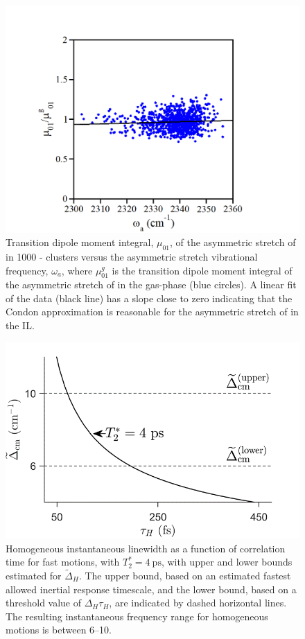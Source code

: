 \documentclass[]{article}
\begin{document}
\begin{figure}[h]
  \centering
  \includegraphics{figure3.png}
  \caption{Transition dipole moment integral, \(\mu_{01}\), of the asymmetric stretch of  in 1000 -\ce{[C4C1im][PF6]} clusters versus the asymmetric stretch vibrational frequency, \(\omega_{a}\), where \(\mu_{01}^{g}\) is the transition dipole moment integral of the asymmetric stretch of  in the gas-phase (blue circles). A linear fit of the data (black line) has a slope close to zero indicating that the Condon approximation is reasonable for the asymmetric stretch of  in the \ce{[C4C1im][PF6]} IL.}
  \label{paper_03:fig3}
\end{figure}

\begin{figure}[h]
  \centering
  \includegraphics{figure4.png}
  \caption{Homogeneous instantaneous linewidth as a function of correlation time for fast motions, with \(T_{2}^{*} = \SI{4}{\pico\second}\), with upper and lower bounds estimated for \({\widetilde{\Delta}}_{H}\). The upper bound, based on an estimated fastest allowed inertial response timescale, and the lower bound, based on a threshold value of \(\Delta_{H}\tau_{H}\), are indicated by dashed horizontal lines. The resulting instantaneous frequency range for homogeneous motions is between \SIrange{6}{10}{\wavenumber}.}
  \label{paper_03:fig4}
\end{figure}
\end{document}
